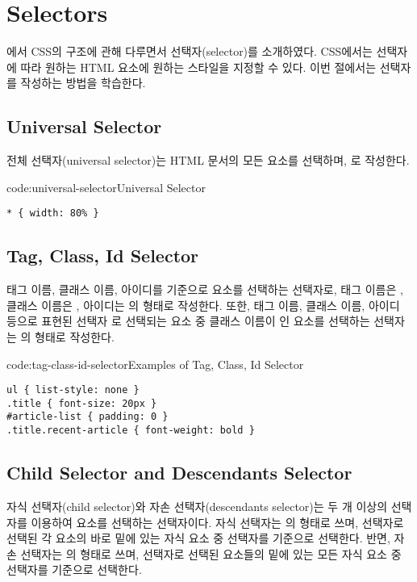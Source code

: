 \section{Selectors}\label{sect:selectors}

에서 CSS의 구조에 관해 다루면서 선택자(selector)를 소개하였다. CSS에서는 선택자에 따라 원하는 HTML 요소에 원하는 스타일을 지정할 수 있다. 이번 절에서는 선택자를 작성하는 방법을 학습한다.

\subsection*{Universal Selector}

전체 선택자(universal selector)는 HTML 문서의 모든 요소를 선택하며, \cd{*}로 작성한다.

\begin{codeenv}{code:universal-selector}{Universal Selector}\begin{verbatim}
* { width: 80% }
\end{verbatim}
\end{codeenv}

\subsection*{Tag, Class, Id Selector}
태그 이름, 클래스 이름, 아이디를 기준으로 요소를 선택하는 선택자로, 태그 이름은 , 클래스 이름은 , 아이디는 의 형태로 작성한다. 또한, 태그 이름, 클래스 이름, 아이디 등으로 표현된 선택자 로 선택되는 요소 중 클래스 이름이 인 요소를 선택하는 선택자는 의 형태로 작성한다.

\begin{codeenv}{code:tag-class-id-selector}{Examples of Tag, Class, Id Selector}\begin{verbatim}
ul { list-style: none }
.title { font-size: 20px }
#article-list { padding: 0 }
.title.recent-article { font-weight: bold }
\end{verbatim}
\end{codeenv}

\subsection*{Child Selector and Descendants Selector}
자식 선택자(child selector)와 자손 선택자(descendants selector)는 두 개 이상의 선택자를 이용하여 요소를 선택하는 선택자이다. 자식 선택자는 의 형태로 쓰며,  선택자로 선택된 각 요소의 바로 밑에 있는 자식 요소 중  선택자를 기준으로 선택한다. 반면, 자손 선택자는 의 형태로 쓰며,  선택자로 선택된 요소들의 밑에 있는 모든 자식 요소 중  선택자를 기준으로 선택한다.

